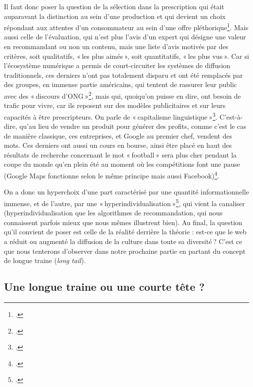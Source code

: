 Il faut donc poser la question de la sélection dans la prescription qui était auparavant la distinction au sein d’une production et qui devient un choix répondant aux attentes d’un consommateur au sein d’une offre pléthorique\footcite{ertzscheid2023}. Mais aussi celle de l’évaluation, qui n’est plus l’avis d’un expert qui désigne une valeur en recommandant ou non un contenu, mais une liste d’avis motivés par des critères, soit qualitatifs, « les plus aimés », soit quantitatifs, « les plus vus ». Car si l’écosystème numérique a permis de court-circuiter les systèmes de diffusion traditionnels, ces derniers n’ont pas totalement disparu et ont été remplacés par des groupes, en immense partie américains, qui tentent de rassurer leur public avec des « discours d’ONG »\footcite[p. 3]{laugee__2013}, mais qui, quoiqu’on puisse en dire, ont besoin de trafic pour vivre, car ils reposent sur des modèles publicitaires et sur leurs capacités à être prescripteurs. On parle de « capitalisme linguistique »\footcite{kaplan_quand_2011}. C’est-à-dire, qu’au lieu de vendre un produit pour générer des profits, comme c’est le cas de manière classique, ces entreprises, et Google au premier chef, vendent des mots. Ces derniers ont aussi un cours en bourse, ainsi être placé en haut des résultats de recherche concernant le mot « football » sera plus cher pendant la coupe du monde qu’en plein été au moment où les compétitions font une pause (Google Maps fonctionne selon le même principe mais aussi Facebook)\footcite{kaplan_quand_2011}.

On a donc un hyperchoix d’une part caractérisé par une quantité informationnelle immense, et de l’autre, par une « hyperindividualisation »\footcite[p. 3]{laugee__2013}, qui vient la canaliser (hyperindividualisation que les algorithmes de recommandation, qui nous connaissent parfois mieux que nous mêmes illustrent bien). Au final, la question qu’il convient de poser est celle de la réalité derrière la théorie : est-ce que le web a réduit ou augmenté la diffusion de la culture dans toute sa diversité ? C’est ce que nous tenterons d’observer dans notre prochaine partie en partant du concept de longue traine (\textit{long tail}).

\subsection{Une longue traine ou une courte tête ?}

